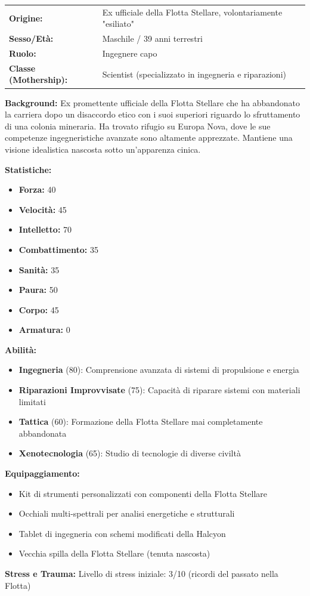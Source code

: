 \documentclass[11pt,a4paper]{article}
\begin{document}
\begin{tcolorbox}[colback=mininglightorange!20, colframe=miningorange]
\begin{tabularx}{\textwidth}{lX}
\textbf{Origine:} & Ex ufficiale della Flotta Stellare, volontariamente "esiliato" \\
\textbf{Sesso/Età:} & Maschile / 39 anni terrestri \\
\textbf{Ruolo:} & Ingegnere capo \\
\textbf{Classe (Mothership):} & Scientist (specializzato in ingegneria e riparazioni) \\
\end{tabularx}

\textbf{Background:} Ex promettente ufficiale della Flotta Stellare che ha abbandonato la carriera dopo un disaccordo etico con i suoi superiori riguardo lo sfruttamento di una colonia mineraria. Ha trovato rifugio su Europa Nova, dove le sue competenze ingegneristiche avanzate sono altamente apprezzate. Mantiene una visione idealistica nascosta sotto un'apparenza cinica.

\textbf{Statistiche:}
\begin{itemize}[leftmargin=*]
\item \textbf{Forza:} 40
\item \textbf{Velocità:} 45
\item \textbf{Intelletto:} 70
\item \textbf{Combattimento:} 35
\item \textbf{Sanità:} 35
\item \textbf{Paura:} 50
\item \textbf{Corpo:} 45
\item \textbf{Armatura:} 0
\end{itemize}

\textbf{Abilità:}
\begin{itemize}[leftmargin=*]
\item \textbf{Ingegneria} (80): Comprensione avanzata di sistemi di propulsione e energia
\item \textbf{Riparazioni Improvvisate} (75): Capacità di riparare sistemi con materiali limitati
\item \textbf{Tattica} (60): Formazione della Flotta Stellare mai completamente abbandonata
\item \textbf{Xenotecnologia} (65): Studio di tecnologie di diverse civiltà
\end{itemize}

\textbf{Equipaggiamento:}
\begin{itemize}[leftmargin=*]
\item Kit di strumenti personalizzati con componenti della Flotta Stellare
\item Occhiali multi-spettrali per analisi energetiche e strutturali
\item Tablet di ingegneria con schemi modificati della Halcyon
\item Vecchia spilla della Flotta Stellare (tenuta nascosta)
\end{itemize}

\textbf{Stress e Trauma:} Livello di stress iniziale: 3/10 (ricordi del passato nella Flotta)
\end{tcolorbox}
\end{document}
